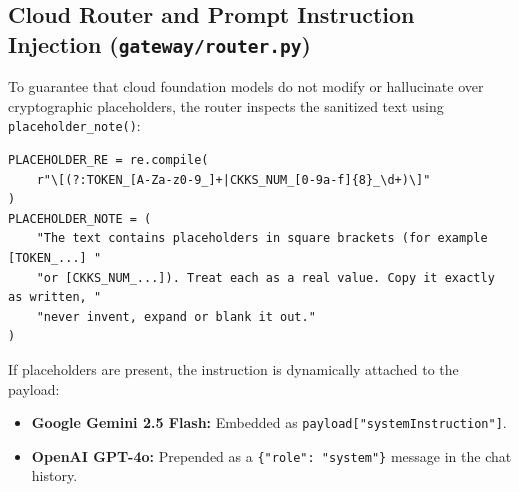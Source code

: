 \subsection{Cloud Router and Prompt Instruction Injection (\texttt{gateway/router.py})}
To guarantee that cloud foundation models do not modify or hallucinate over cryptographic placeholders, the router inspects the sanitized text using \texttt{placeholder\_note()}:
\begin{verbatim}
PLACEHOLDER_RE = re.compile(
    r"\[(?:TOKEN_[A-Za-z0-9_]+|CKKS_NUM_[0-9a-f]{8}_\d+)\]"
)
PLACEHOLDER_NOTE = (
    "The text contains placeholders in square brackets (for example [TOKEN_...] "
    "or [CKKS_NUM_...]). Treat each as a real value. Copy it exactly as written, "
    "never invent, expand or blank it out."
)
\end{verbatim}
If placeholders are present, the instruction is dynamically attached to the payload:
\begin{itemize}[leftmargin=*]
    \item \textbf{Google Gemini 2.5 Flash:} Embedded as \texttt{payload["systemInstruction"]}.
    \item \textbf{OpenAI GPT-4o:} Prepended as a \texttt{\{"role": "system"\}} message in the chat history.
\end{itemize}

